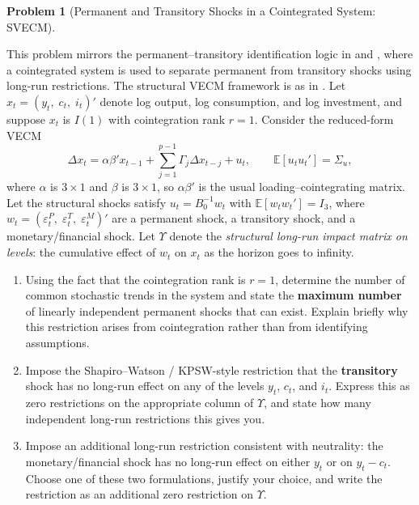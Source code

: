 \documentclass[12pt]{article}
\newcommand{\E}{\mathbb E}
\theoremstyle{definition} %
\newtheorem{problem}{Problem}
\theoremstyle{plain}
\begin{document}
\begin{problem}[Permanent and Transitory Shocks in a Cointegrated System: SVECM]
\label{prob:svecm}

This problem mirrors the permanent--transitory identification logic in \citet{ShapiroWatson1988} and \citet{KingPlosserStockWatson1991}, where a cointegrated system is used to separate permanent from transitory shocks using long-run restrictions. The structural VECM framework is as in \citet{Lutkepohl2005}. Let $x_t = (y_t,\; c_t,\; i_t)'$ denote log output, log consumption, and log investment, and suppose $x_t$ is $I(1)$ with cointegration rank $r=1$. Consider the reduced-form VECM
\begin{equation}
\Delta x_t = \alpha \beta' x_{t-1} + \sum_{j=1}^{p-1} \Gamma_j \Delta x_{t-j} + u_t,
\qquad \E[u_t u_t'] = \Sigma_u,
\end{equation}
where $\alpha$ is $3\times 1$ and $\beta$ is $3\times 1$, so $\alpha\beta'$ is the usual loading--cointegrating matrix. Let the structural shocks satisfy $u_t = B_0^{-1} w_t$ with $\E[w_t w_t'] = I_3$, where $w_t = (\varepsilon_t^P,\; \varepsilon_t^T,\; \varepsilon_t^M)'$ are a permanent shock, a transitory shock, and a monetary/financial shock.
Let $\Upsilon$ denote the \emph{structural long-run impact matrix on levels}: the cumulative effect of $w_t$ on $x_t$ as the horizon goes to infinity.

\begin{enumerate}[label=(\alph*)]
\item Using the fact that the cointegration rank is $r=1$, determine the number of common stochastic trends in the system and state the \textbf{maximum number} of linearly independent permanent shocks that can exist. Explain briefly why this restriction arises from cointegration rather than from identifying assumptions.

\item Impose the Shapiro--Watson / KPSW-style restriction that the \textbf{transitory} shock has no long-run effect on any of the levels $y_t$, $c_t$, and $i_t$. Express this as zero restrictions on the appropriate column of $\Upsilon$, and state how many independent long-run restrictions this gives you.

\item Impose an additional long-run restriction consistent with neutrality: the monetary/financial shock has no long-run effect on either $y_t$ or on $y_t - c_t$. Choose one of these two formulations, justify your choice, and write the restriction as an additional zero restriction on $\Upsilon$.


\end{enumerate}
\end{problem}
\end{document}
